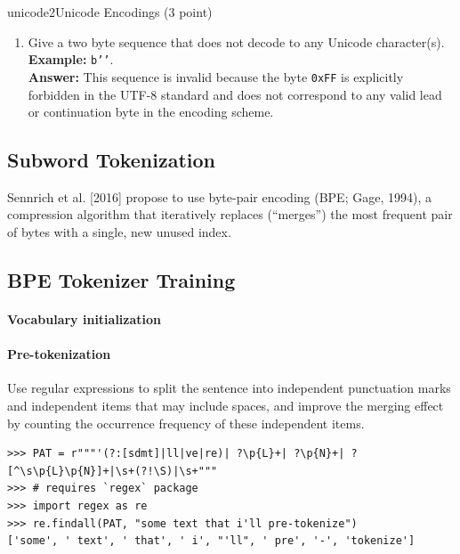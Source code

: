 \begin{problembox}{unicode2}{Unicode Encodings (3 point)}
\begin{enumerate}[label=(\alph*), itemsep=0.5em, topsep=0pt]
              \textbf{Example:} \texttt{b'\xad'}.\\
              \textbf{Answer:} This function is incorrect because it attempts to decode each byte individually, which fails for any character encoded as a multi-byte sequence, resulting in a \texttt{UnicodeDecodeError}.

        \item Give a two byte sequence that does not decode to any Unicode character(s).\\
              \textbf{Example:} \texttt{b'\xff\xff'}.\\
              \textbf{Answer:} This sequence is invalid because the byte \texttt{0xFF} is explicitly forbidden in the UTF-8 standard and does not correspond to any valid lead or continuation byte in the encoding scheme.

    \end{enumerate}

\end{problembox}

\subsection{Subword Tokenization}

Sennrich et al. [2016] propose to use byte-pair encoding (BPE; Gage, 1994), a compression algorithm that iteratively replaces (``merges'') the most frequent pair of bytes with a single, new unused index.

\subsection{BPE Tokenizer Training}

\paragraph{Vocabulary initialization}

\paragraph{Pre-tokenization}
Use regular expressions to split the sentence into independent punctuation marks and independent items that may include spaces, and improve the merging effect by counting the occurrence frequency of these independent items.
\begin{verbatim}
>>> PAT = r"""'(?:[sdmt]|ll|ve|re)| ?\p{L}+| ?\p{N}+| ?[^\s\p{L}\p{N}]+|\s+(?!\S)|\s+"""
>>> # requires `regex` package
>>> import regex as re
>>> re.findall(PAT, "some text that i'll pre-tokenize")
['some', ' text', ' that', ' i', "'ll", ' pre', '-', 'tokenize']
\end{verbatim}

